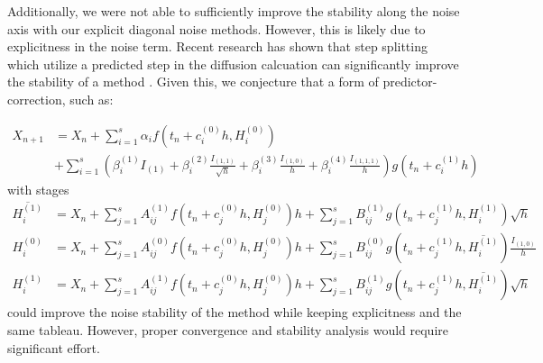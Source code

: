 \documentclass{article}
\begin{document}
Additionally, we were not able to sufficiently improve the stability
along the noise axis with our explicit diagonal noise methods. However,
this is likely due to explicitness in the noise term. Recent research
has shown that step splitting which utilize a predicted step in the
diffusion calcuation can significantly improve the stability of a
method \cite{RN3815,RN3816}. Given this, we conjecture that a form
of predictor-correction, such as:

\begin{align}
X_{n+1}&=X_{n}+\sum_{i=1}^{s}\alpha_{i}f\left(t_{n}+c_{i}^{(0)}h,H_{i}^{(0)}\right)\\
&+\sum_{i=1}^{s}\left(\beta_{i}^{(1)}I_{(1)}+\beta_{i}^{(2)}\frac{I_{(1,1)}}{\sqrt{h}}+\beta_{i}^{(3)}\frac{I_{(1,0)}}{h}+\beta_{i}^{(4)}\frac{I_{(1,1,1)}}{h}\right)g\left(t_{n}+c_{i}^{(1)}h\right)\label{eq:update-1}
\end{align}
with stages
\begin{align}
\overline{H_{i}^{(1)}} & =X_{n}+\sum_{j=1}^{s}A_{ij}^{(1)}f\left(t_{n}+c_{j}^{(0)}h,H_{j}^{(0)}\right)h+\sum_{j=1}^{s}B_{ij}^{(1)}g\left(t_{n}+c_{j}^{(1)}h,H_{i}^{(1)}\right)\sqrt{h}\label{eq:stages-1}\\
H_{i}^{(0)} & =X_{n}+\sum_{j=1}^{s}A_{ij}^{(0)}f\left(t_{n}+c_{j}^{(0)}h,H_{j}^{(0)}\right)h+\sum_{j=1}^{s}B_{ij}^{(0)}g\left(t_{n}+c_{j}^{(1)}h,\overline{H_{i}^{(1)}}\right)\frac{I_{(1,0)}}{h}\\
H_{i}^{(1)} & =X_{n}+\sum_{j=1}^{s}A_{ij}^{(1)}f\left(t_{n}+c_{j}^{(0)}h,H_{j}^{(0)}\right)h+\sum_{j=1}^{s}B_{ij}^{(1)}g\left(t_{n}+c_{j}^{(1)}h,\overline{H_{i}^{(1)}}\right)\sqrt{h}\nonumber
\end{align}
could improve the noise stability of the method while keeping explicitness
and the same tableau. However, proper convergence and stability analysis
would require significant effort.
\end{document}
